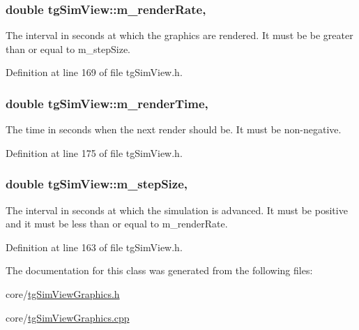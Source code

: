\hypertarget{classtg_sim_view_a94f30c9f4a98a01c7171de6d7d00e92a}{
\subsubsection[{m\-\_\-render\-Rate}]{\setlength{\rightskip}{0pt plus 5cm}double tg\-Sim\-View\-::m\-\_\-render\-Rate\hspace{0.3cm}{\ttfamily [protected]}, {\ttfamily [inherited]}}}\label{classtg_sim_view_a94f30c9f4a98a01c7171de6d7d00e92a}
The interval in seconds at which the graphics are rendered. It must be be greater than or equal to m\-\_\-step\-Size. 

Definition at line 169 of file tg\-Sim\-View.\-h.

\hypertarget{classtg_sim_view_af9665b86a366fc966bedf3f11fc1917d}{
\subsubsection[{m\-\_\-render\-Time}]{\setlength{\rightskip}{0pt plus 5cm}double tg\-Sim\-View\-::m\-\_\-render\-Time\hspace{0.3cm}{\ttfamily [protected]}, {\ttfamily [inherited]}}}\label{classtg_sim_view_af9665b86a366fc966bedf3f11fc1917d}
The time in seconds when the next render should be. It must be non-\/negative. 

Definition at line 175 of file tg\-Sim\-View.\-h.

\hypertarget{classtg_sim_view_a150d4c27a7a07d538aa405407e6ec239}{
\subsubsection[{m\-\_\-step\-Size}]{\setlength{\rightskip}{0pt plus 5cm}double tg\-Sim\-View\-::m\-\_\-step\-Size\hspace{0.3cm}{\ttfamily [protected]}, {\ttfamily [inherited]}}}\label{classtg_sim_view_a150d4c27a7a07d538aa405407e6ec239}
The interval in seconds at which the simulation is advanced. It must be positive and it must be less than or equal to m\-\_\-render\-Rate. 

Definition at line 163 of file tg\-Sim\-View.\-h.



The documentation for this class was generated from the following files\-:\begin{DoxyCompactItemize}
\item 
core/\hyperlink{tg_sim_view_graphics_8h}{tg\-Sim\-View\-Graphics.\-h}\item 
core/\hyperlink{tg_sim_view_graphics_8cpp}{tg\-Sim\-View\-Graphics.\-cpp}\end{DoxyCompactItemize}
